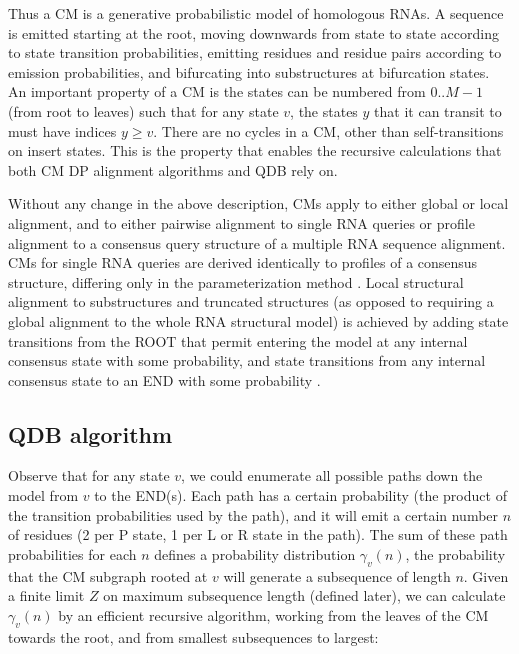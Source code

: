 \documentclass[11pt]{article}
\begin{document}
Thus a CM is a generative probabilistic model of homologous RNAs.  A
sequence is emitted starting at the root, moving downwards from state
to state according to state transition probabilities, emitting
residues and residue pairs according to emission probabilities, and
bifurcating into substructures at bifurcation states. An important
property of a CM is the states can be numbered from $0..M-1$ (from root
to leaves) such that for any state $v$, the states $y$ that it can
transit to must have indices $y \geq v$. There are no cycles in a
CM, other than self-transitions on insert states.  This is the
property that enables the recursive calculations that both CM DP
alignment algorithms and QDB rely on.

Without any change in the above description, CMs apply to either
global or local alignment, and to either pairwise alignment to single
RNA queries or profile alignment to a consensus query structure of a
multiple RNA sequence alignment. CMs for single RNA queries are
derived identically to profiles of a consensus structure, differing
only in the parameterization method \cite{KleinEddy03}. Local
structural alignment to substructures and truncated structures (as
opposed to requiring a global alignment to the whole RNA structural
model) is achieved by adding state transitions from the ROOT that
permit entering the model at any internal consensus state with some
probability, and state transitions from any internal consensus state 
to an END with some probability \cite{KleinEddy03, infguide03}.

\subsection{QDB algorithm}

Observe that for any state $v$, we could enumerate all possible paths
down the model from $v$ to the END(s). Each path has a certain
probability (the product of the transition probabilities used by the
path), and it will emit a certain number $n$ of residues (2 per P
state, 1 per L or R state in the path). The sum of these path
probabilities for each $n$ defines a probability distribution
$\gamma_v(n)$, the probability that the CM subgraph rooted at $v$ will
generate a subsequence of length $n$. Given a finite limit $Z$ on
maximum subsequence length (defined later), we can calculate
$\gamma_v(n)$ by an efficient recursive algorithm, working from the
leaves of the CM towards the root, and from smallest subsequences to
largest:
\end{document}
